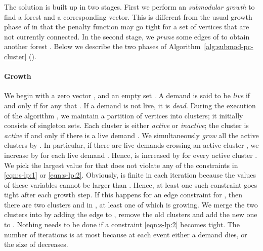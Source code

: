  

The solution is built up in two stages.
First we perform an \emph{submodular growth} to find a forest  and a corresponding  vector.
This is different from the usual growth phase of \cite{GW95, AKR91} in that
the penalty function may go tight for a set of vertices that are not currently connected.
In the second stage, we \emph{prune} some  edges of  to obtain another forest .
Below we describe the two phases of Algorithm~\ref{alg:submod-pc-cluster} ().



\paragraph{Growth}
 We begin with a zero vector , and an empty set .
 A demand  is said to be \emph{live} if and only if
 for any  that .  
If a demand is not live, it is \emph{dead}.
 During the execution of the algorithm , 
we maintain a partition  of vertices  into clusters; 
it initially consists of singleton sets.
 Each cluster is either \emph{active} or \emph{inactive};
  the cluster  is \emph{active} if and only if there is a live demand .
We simultaneously \emph{grow} all the active clusters by .
 In particular, if there are  live demands crossing an active cluster , 
we increase  by  for each live demand .
 Hence,  is increased by  for every active cluster .
 We pick the largest value for  that does not violate any of the constraints in \eqref{eqn:s-lp:1} or \eqref{eqn:s-lp:2}.
 Obviously,  is finite in each iteration because the 
values of these variables cannot be larger than .
 Hence, at least one such constraint goes tight after each growth step.
 If this happens for an edge constraint for ,
 then there are two clusters  and  in ,
 at least one of which is growing.
 We merge the two clusters into  by adding the 
edge  to , remove the old clusters and add the new one to .
 Nothing needs to be done if a constraint \eqref{eqn:s-lp:2} becomes tight.
The number of iterations is at most  because at each 
event either a demand dies, or the size of  decreases.

